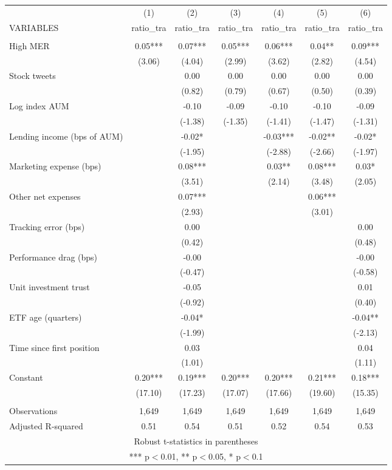 \documentclass[]{article}
\begin{document}
\begin{tabular}{lcccccc} \hline
 & (1) & (2) & (3) & (4) & (5) & (6) \\
VARIABLES & ratio\_tra & ratio\_tra & ratio\_tra & ratio\_tra & ratio\_tra & ratio\_tra \\ \hline
 &  &  &  &  &  &  \\
High MER & 0.05*** & 0.07*** & 0.05*** & 0.06*** & 0.04** & 0.09*** \\
 & (3.06) & (4.04) & (2.99) & (3.62) & (2.82) & (4.54) \\
Stock tweets &  & 0.00 & 0.00 & 0.00 & 0.00 & 0.00 \\
 &  & (0.82) & (0.79) & (0.67) & (0.50) & (0.39) \\
Log index AUM &  & -0.10 & -0.09 & -0.10 & -0.10 & -0.09 \\
 &  & (-1.38) & (-1.35) & (-1.41) & (-1.47) & (-1.31) \\
Lending income (bps of AUM) &  & -0.02* &  & -0.03*** & -0.02** & -0.02* \\
 &  & (-1.95) &  & (-2.88) & (-2.66) & (-1.97) \\
Marketing expense (bps) &  & 0.08*** &  & 0.03** & 0.08*** & 0.03* \\
 &  & (3.51) &  & (2.14) & (3.48) & (2.05) \\
Other net expenses &  & 0.07*** &  &  & 0.06*** &  \\
 &  & (2.93) &  &  & (3.01) &  \\
Tracking error (bps) &  & 0.00 &  &  &  & 0.00 \\
 &  & (0.42) &  &  &  & (0.48) \\
Performance drag (bps) &  & -0.00 &  &  &  & -0.00 \\
 &  & (-0.47) &  &  &  & (-0.58) \\
Unit investment trust &  & -0.05 &  &  &  & 0.01 \\
 &  & (-0.92) &  &  &  & (0.40) \\
ETF age (quarters) &  & -0.04* &  &  &  & -0.04** \\
 &  & (-1.99) &  &  &  & (-2.13) \\
Time since first position &  & 0.03 &  &  &  & 0.04 \\
 &  & (1.01) &  &  &  & (1.11) \\
Constant & 0.20*** & 0.19*** & 0.20*** & 0.20*** & 0.21*** & 0.18*** \\
 & (17.10) & (17.23) & (17.07) & (17.66) & (19.60) & (15.35) \\
 &  &  &  &  &  &  \\
Observations & 1,649 & 1,649 & 1,649 & 1,649 & 1,649 & 1,649 \\
 Adjusted R-squared & 0.51 & 0.54 & 0.51 & 0.52 & 0.54 & 0.53 \\ \hline
\multicolumn{7}{c}{ Robust t-statistics in parentheses} \\
\multicolumn{7}{c}{ *** p$<$0.01, ** p$<$0.05, * p$<$0.1} \\
\end{tabular}
\end{document}
